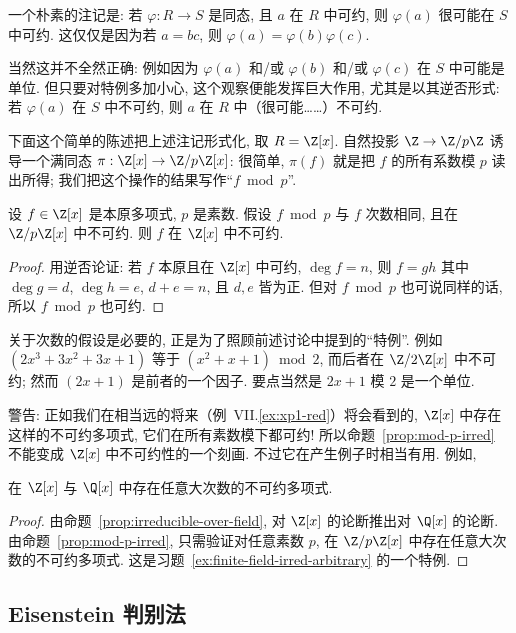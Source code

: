 一个朴素的注记是: 若 $\varphi:R\to S$ 是同态, 且 $a$ 在 $R$ 中可约, 则 $\varphi(a)$ 很可能在 $S$ 中可约. 这仅仅是因为若 $a=bc$, 则 $\varphi(a)=\varphi(b)\varphi(c)$.

当然这并不全然正确: 例如因为 $\varphi(a)$ 和/或 $\varphi(b)$ 和/或 $\varphi(c)$ 在 $S$ 中可能是单位. 但只要对特例多加小心, 这个观察便能发挥巨大作用, 尤其是以其逆否形式: 若 $\varphi(a)$ 在 $S$ 中不可约, 则 $a$ 在 $R$ 中（很可能……）不可约.

下面这个简单的陈述把上述注记形式化, 取 $R=\Z[x]$. 自然投影 $\Z\to\Z/p\Z$ 诱导一个满同态 $\pi:\Z[x]\to\Z/p\Z[x]$: 很简单, $\pi(f)$ 就是把 $f$ 的所有系数模 $p$ 读出所得; 我们把这个操作的结果写作``$f\bmod p$''.

\begin{proposition}\label{prop:mod-p-irred}
设 $f\in\Z[x]$ 是本原多项式, $p$ 是素数. 假设 $f\bmod p$ 与 $f$ 次数相同, 且在 $\Z/p\Z[x]$ 中不可约. 则 $f$ 在 $\Z[x]$ 中不可约.
\end{proposition}

\begin{proof}
用逆否论证: 若 $f$ 本原且在 $\Z[x]$ 中可约, $\deg f=n$, 则 $f=gh$ 其中 $\deg g=d$, $\deg h=e$, $d+e=n$, 且 $d,e$ 皆为正. 但对 $f\bmod p$ 也可说同样的话, 所以 $f\bmod p$ 也可约.
\end{proof}

关于次数的假设是必要的, 正是为了照顾前述讨论中提到的``特例''. 例如 $(2x^3+3x^2+3x+1)$ 等于 $(x^2+x+1)\bmod 2$, 而后者在 $\Z/2\Z[x]$ 中不可约; 然而 $(2x+1)$ 是前者的一个因子. 要点当然是 $2x+1$ 模 $2$ 是一个单位.

警告: 正如我们在相当远的将来（例~VII.\ref{ex:xp1-red}）将会看到的, $\Z[x]$ 中存在这样的不可约多项式, 它们在所有素数模下都可约! 所以命题~\ref{prop:mod-p-irred} 不能变成 $\Z[x]$ 中不可约性的一个刻画. 不过它在产生例子时相当有用. 例如,

\begin{corollary}\label{cor:arbitrary-degree-irred}
在 $\Z[x]$ 与 $\Q[x]$ 中存在任意大次数的不可约多项式.
\end{corollary}

\begin{proof}
由命题~\ref{prop:irreducible-over-field}, 对 $\Z[x]$ 的论断推出对 $\Q[x]$ 的论断. 由命题~\ref{prop:mod-p-irred}, 只需验证对任意素数 $p$, 在 $\Z/p\Z[x]$ 中存在任意大次数的不可约多项式. 这是习题~\ref{ex:finite-field-irred-arbitrary} 的一个特例.
\end{proof}

\subsection{Eisenstein 判别法}
\label{subsec:eisenstein}

